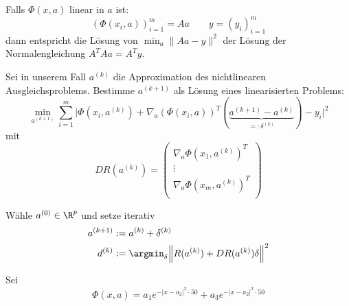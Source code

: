 \documentclass[11pt]{scrbook}
\begin{document}
Falls $\Phi(x,a)$ linear in $a$ ist:
\[
	(\Phi(x_i, a))_{i=1}^m = A a
	\qquad y = (y_i)_{i=1}^m
\]
dann entspricht die Lösung von $\min_{a} \| Aa - y\|^2$ der Lösung der Normalengleichung $A^TA a = A^T y$.

Sei in unserem Fall $a^{(k)}$ die Approximation des nichtlinearen Ausgleichsproblems.
Bestimme $a^{(k+1)}$ als Lösung eines linearisierten Problems:
\[
	\min_{a^{(k+1)}} \sum_{i=1}^m \Big| \Phi(x_i, a^{(k)}) + \nabla_a(\Phi(x_i, a))^T (\underbrace{a^{(k+1)} - a^{(k)}}_{=: \delta^{(k)}}) - y_i \Big|^2
\]
mit
\[
	DR (a^{(k)}) = \begin{pmatrix}
		\nabla_a \Phi(x_1, a^{(k)})^T \\
		\vdots \\
		\nabla_a \Phi(x_m, a^{(k)})^T \\
	\end{pmatrix}
\]

\begin{df} \label{4.27}
	Wähle $a^{(0)} \in \R^p$ und setze iterativ
	\begin{align*}
		a^{(k+1)} &:= a^{(k)} + \delta^{(k)} \\
		d^{(k)} &:=  \argmin_{\delta} \Big\| R(a^{(k)}) + DR(a^{(k)}) \delta \Big\|^2
	\end{align*}
\end{df}

\begin{ex*}
	Sei
	\[
		\Phi(x, a) = a_1 e^{-|x - a_2|^2 \cdot 50} + a_3 e^{-|x-a_2|^2 \cdot 50}
	\]
\end{ex*}
\end{document}
